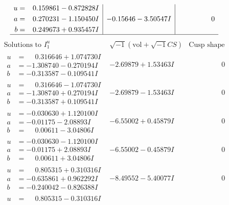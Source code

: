 \documentclass[1p]{elsarticle_modified}
\theoremstyle{definition}
\newcommand{\I}{\sqrt{-1}}
\begin{document}
$$\begin{array}{c|c|c}
\begin{aligned}
u &= \phantom{-}0.159861 - 0.872828 I \\
a &= \phantom{-}0.270231 - 1.150450 I \\
b &= \phantom{-}0.249673 + 0.935457 I\end{aligned}
 & -0.15646 - 3.50547 I & \phantom{-0.000000 } 0\\
 \hline 
 \end{array}$$\newpage$$\begin{array}{c|c|c}  
\text{Solutions to }I^u_{1}& \I (\text{vol} + \sqrt{-1}CS) & \text{Cusp shape}\\
 \hline 
\begin{aligned}
u &= \phantom{-}0.316646 + 1.074730 I \\
a &= -1.308740 - 0.270194 I \\
b &= -0.313587 - 0.109541 I\end{aligned}
 & -2.69879 + 1.53463 I & \phantom{-0.000000 } 0 \\ \hline\begin{aligned}
u &= \phantom{-}0.316646 - 1.074730 I \\
a &= -1.308740 + 0.270194 I \\
b &= -0.313587 + 0.109541 I\end{aligned}
 & -2.69879 - 1.53463 I & \phantom{-0.000000 } 0 \\ \hline\begin{aligned}
u &= -0.030630 + 1.120100 I \\
a &= -0.01175 - 2.08893 I \\
b &= \phantom{-}0.00611 - 3.04806 I\end{aligned}
 & -6.55002 + 0.45879 I & \phantom{-0.000000 } 0 \\ \hline\begin{aligned}
u &= -0.030630 - 1.120100 I \\
a &= -0.01175 + 2.08893 I \\
b &= \phantom{-}0.00611 + 3.04806 I\end{aligned}
 & -6.55002 - 0.45879 I & \phantom{-0.000000 } 0 \\ \hline\begin{aligned}
u &= \phantom{-}0.805315 + 0.310316 I \\
a &= -0.635861 + 0.962292 I \\
b &= -0.240042 - 0.826388 I\end{aligned}
 & -8.49552 - 5.40077 I & \phantom{-0.000000 } 0 \\ \hline\begin{aligned}
u &= \phantom{-}0.805315 - 0.310316 I \\

\end{aligned}
\end{array}$$
\end{document}
